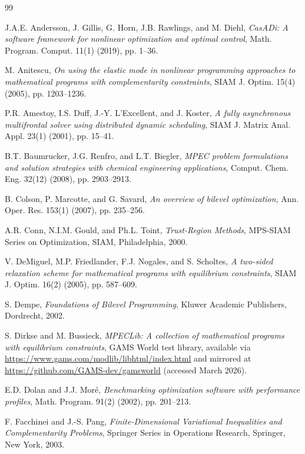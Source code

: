 \begin{thebibliography}{99}

J.A.E. Andersson, J. Gillis, G. Horn, J.B. Rawlings, and M. Diehl,
\emph{CasADi: A software framework for nonlinear optimization and
optimal control}, Math. Program. Comput. 11(1) (2019), pp. 1--36.


M. Anitescu, \emph{On using the elastic mode in nonlinear programming
approaches to mathematical programs with complementarity constraints},
SIAM J. Optim. 15(4) (2005), pp. 1203--1236.


P.R. Amestoy, I.S. Duff, J.-Y. L'Excellent, and J. Koster, \emph{A fully asynchronous multifrontal solver using distributed dynamic scheduling}, SIAM J. Matrix Anal. Appl. 23(1) (2001), pp. 15--41.


B.T. Baumrucker, J.G. Renfro, and L.T. Biegler, \emph{{MPEC} problem formulations and solution strategies with chemical engineering
applications}, Comput. Chem. Eng. 32(12) (2008), pp. 2903--2913.


B. Colson, P. Marcotte, and G. Savard, \emph{An overview of bilevel optimization}, Ann. Oper. Res. 153(1) (2007), pp. 235--256.


A.R. Conn, N.I.M. Gould, and Ph.L. Toint, \emph{Trust-Region Methods},
MPS-SIAM Series on Optimization, SIAM, Philadelphia, 2000.


V. DeMiguel, M.P. Friedlander, F.J. Nogales, and S. Scholtes, \emph{A
two-sided relaxation scheme for mathematical programs with equilibrium
constraints}, SIAM J. Optim. 16(2) (2005), pp. 587--609.


S. Dempe, \emph{Foundations of Bilevel Programming}, Kluwer Academic
Publishers, Dordrecht, 2002.


S. Dirkse and M. Bussieck, \emph{{MPECLib}: A collection of
mathematical programs with equilibrium constraints}, GAMS World test
library, available via \url{https://www.gams.com/modlib/libhtml/index.html}
and mirrored at \url{https://github.com/GAMS-dev/gamsworld}
(accessed March 2026).


E.D. Dolan and J.J. Mor\'{e}, \emph{Benchmarking optimization software
with performance profiles}, Math. Program. 91(2) (2002), pp. 201--213.


F. Facchinei and J.-S. Pang, \emph{Finite-Dimensional Variational
Inequalities and Complementarity Problems}, Springer Series in
Operations Research, Springer, New York, 2003.



\end{thebibliography}
